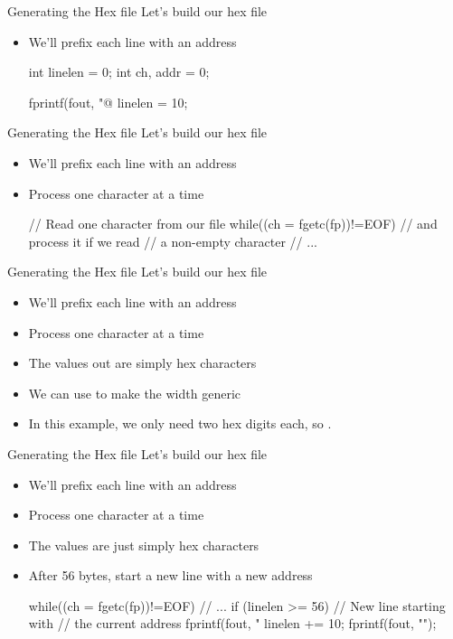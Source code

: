 \documentclass[style=gt,mode=present,paper=screen]{powerdot}
\begin{document}
%
%
\begin{slide}[bm=,toc=,method=direct]{Generating the Hex file}
Let's build our hex file
\begin{itemize}
\item We'll prefix each line with an address
\begin{zCpp}
int	linelen = 0;
int	ch, addr = 0;

fprintf(fout, "@%
linelen = 10;
\end{zCpp}
\end{itemize}
\end{slide}
%
\begin{slide}[bm=,toc=,method=direct]{Generating the Hex file}
Let's build our hex file
\begin{itemize}
\item We'll prefix each line with an address
\item Process one character at a time
\begin{zCpp}
// Read one character from our file
while((ch = fgetc(fp))!=EOF) {
    // and process it if we read
    // a non-empty character
    // ...
}
\end{zCpp}
\end{itemize}
\end{slide}
%
%
\begin{slide}[bm=,toc=,method=direct]{Generating the Hex file}
Let's build our hex file
\begin{itemize}
\item We'll prefix each line with an address
\item Process one character at a time
\item The values out are simply hex characters
\begin{zCpp}
// ...
while((ch = fgetc(fp))!=EOF) {
	fprintf(fout, "%
	    (nbits+3)/4,
	    ch & 0x0ff);
	linelen += 3;
	addr++;
	// ...
\end{zCpp}
\item We can use  to make the width generic
\item In this example, we only need two hex digits each, so
	.
\end{itemize}
\end{slide}
%
%
\begin{slide}[bm=,toc=,method=direct]{Generating the Hex file}
Let's build our hex file
\begin{itemize}
\item We'll prefix each line with an address
\item Process one character at a time
\item The values are just simply hex characters
\item After 56 bytes, start a new line with a new address
\begin{zCpp}
while((ch = fgetc(fp))!=EOF) {
    // ...
    if (linelen >= 56) {
        // New line starting with
	// the current address
        fprintf(fout, "\n@%
        linelen += 10;
    }
} fprintf(fout, "\n");
\end{zCpp}
\end{itemize}
\end{slide}
\end{document}
